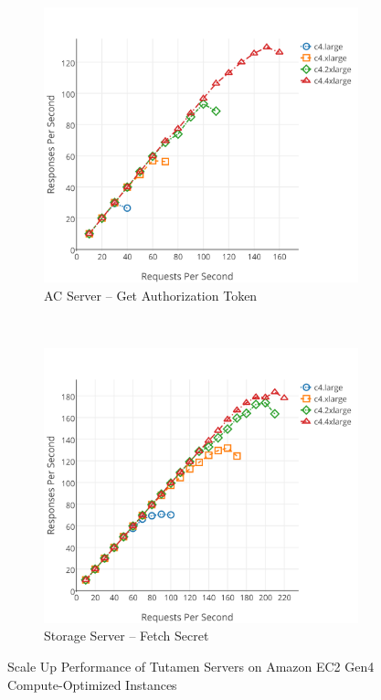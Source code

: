 \begin{figure}[th]
  \centering
  \begin{subfigure}[t]{0.48\textwidth}
    \includegraphics[width=\textwidth]{./figs/png/get_ac_auth_comp_chart.png}
    \caption{AC Server -- Get Authorization Token}
    \label{fig:eval:scaleup:gettoken}
  \end{subfigure}
  ~
  \begin{subfigure}[t]{0.48\textwidth}
    \includegraphics[width=\textwidth]{./figs/png/get_ss_secret_comp_chart.png}
    \caption{Storage Server -- Fetch Secret}
    \label{fig:eval:scaleup:getsecret}
  \end{subfigure}
  \caption{Scale Up Performance of Tutamen Servers on Amazon EC2
    Gen4 Compute-Optimized Instances}
  \label{fig:eval:scaleup}
\end{figure}

